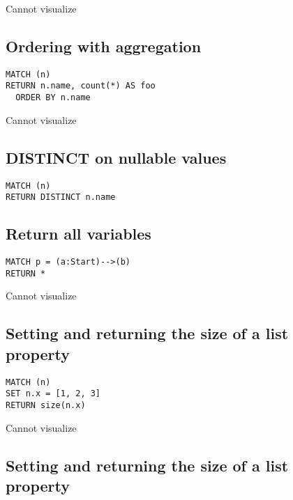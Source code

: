Cannot visualize
\subsection{Ordering with aggregation}

\begin{lstlisting}
MATCH (n)
RETURN n.name, count(*) AS foo
  ORDER BY n.name
\end{lstlisting}

Cannot visualize
\subsection{DISTINCT on nullable values}

\begin{lstlisting}
MATCH (n)
RETURN DISTINCT n.name
\end{lstlisting}

\subsection{Return all variables}

\begin{lstlisting}
MATCH p = (a:Start)-->(b)
RETURN *
\end{lstlisting}

Cannot visualize
\subsection{Setting and returning the size of a list property}

\begin{lstlisting}
MATCH (n)
SET n.x = [1, 2, 3]
RETURN size(n.x)
\end{lstlisting}

Cannot visualize
\subsection{Setting and returning the size of a list property}

